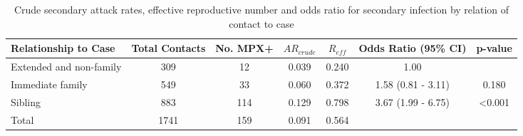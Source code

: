 
\begin{table}
\centering
    \caption{Crude secondary attack rates, effective reproductive number and odds ratio for secondary infection by relation of contact to case}
    \begin{tabular}{@{}lcccccc@{}}
    \toprule
    Relationship to Case & Total Contacts  & No. MPX+ & $AR_{crude}$ & $R_{eff}$ & Odds Ratio (95\% CI)  & p-value \\
    \midrule
  Extended and non-family   &  309   &   12   & 0.039 & 0.240 & 1.00               &  ~ \\
  Immediate family  &  549   &   33   & 0.060 & 0.372 & 1.58 (0.81 - 3.11) & 0.180 \\
  Sibling           &  883   &   114  & 0.129 & 0.798 & 3.67 (1.99 - 6.75) & \textless0.001 \\
  Total             &  1741  &   159  & 0.091 & 0.564 & ~                 & ~ \\
    \bottomrule
    \end{tabular}
\end{table}

